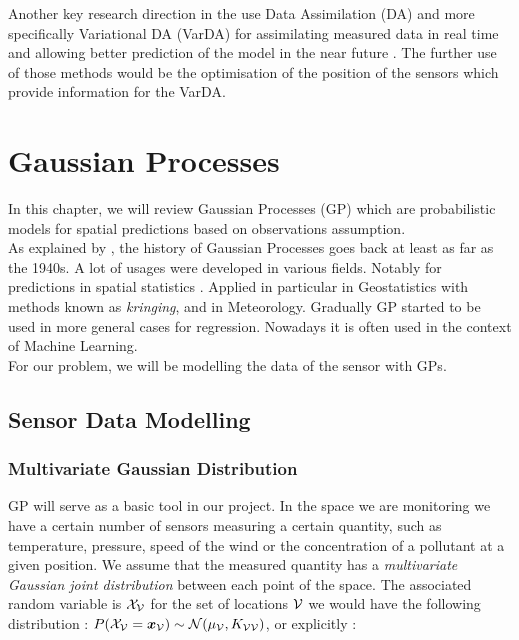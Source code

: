 Another key research direction in the use Data Assimilation (DA) and more specifically Variational DA (VarDA) for assimilating measured data in real time and allowing better prediction of the model in the near future \citep{arcucci_effective_2018}. The further use of those methods would be the optimisation of the position of the sensors which provide information for the VarDA.


\section{Gaussian Processes}

In this chapter, we will review Gaussian Processes (GP) which are probabilistic models for spatial predictions based on observations assumption. \\ 

As explained by \citet[p.~29]{rasmussen_gaussian_2006}, the history of Gaussian Processes goes back at least as far as the 1940s. A lot of usages were developed in various fields. Notably for predictions in spatial statistics \citep{cressie_statistics_1991}.  Applied in particular in Geostatistics with methods known as \textit{kringing}, and in Meteorology. Gradually GP started to be used in more general cases for regression. Nowadays it is often used in the context of Machine Learning. \\


For our problem, we will be modelling the data of the sensor with GPs.

\subsection{Sensor Data Modelling}

\subsubsection{Multivariate Gaussian Distribution}

GP will serve as a basic tool in our project. In the space we are monitoring we have a certain number of sensors measuring a certain quantity, such as temperature, pressure, speed of the wind or the concentration of a pollutant at a given position. We assume that the measured quantity has a \textit{multivariate Gaussian joint distribution} between each point of the space. The associated random variable is $\mathcal{X}_{\mathcal{V}}$ for the set of locations $\mathcal{V}$ we would have the following distribution : $P(\mathcal{X}_{\mathcal{V}} = {\boldsymbol{{x}}}_{\mathcal{V}}) \sim \mathcal{N}(\mu_{\mathcal{V}}, K_{\mathcal{V}\mathcal{V}}) $, or explicitly : 


